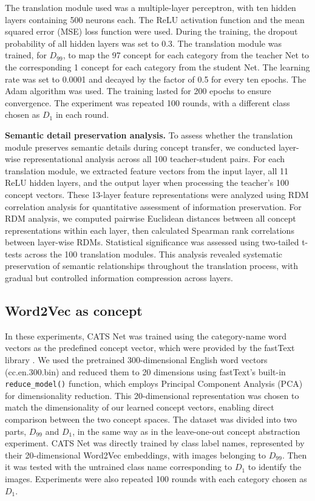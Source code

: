\documentclass[pdflatex,sn-mathphys-num,lineno]{sn-jnl}%
\begin{document}
\begin{CJK}{UTF8}{gbsn}
The translation module used was a multiple-layer perceptron, with ten hidden layers containing 500 neurons each. The ReLU activation function and the mean squared error (MSE) loss function were used. During the training, the dropout probability of all hidden layers was set to 0.3. The translation module was trained, for $D_{99}$, to map the 97 concept for each category from the teacher Net to the corresponding 1 concept for each category from the student Net. The learning rate was set to 0.0001 and decayed by the factor of 0.5 for every ten epochs. The Adam \cite{kingma_adam_2015} algorithm was used. The training lasted for 200 epochs to ensure convergence. The experiment was repeated 100 rounds, with a different class chosen as $D_1$ in each round.

\textbf{Semantic detail preservation analysis.} To assess whether the translation module preserves semantic details during concept transfer, we conducted layer-wise representational analysis across all 100 teacher-student pairs. For each translation module, we extracted feature vectors from the input layer, all 11 ReLU hidden layers, and the output layer when processing the teacher's 100 concept vectors. These 13-layer feature representations were analyzed using RDM correlation analysis for quantitative assessment of information preservation. For RDM analysis, we computed pairwise Euclidean distances between all concept representations within each layer, then calculated Spearman rank correlations between layer-wise RDMs. Statistical significance was assessed using two-tailed t-tests across the 100 translation modules. This analysis revealed systematic preservation of semantic relationships throughout the translation process, with gradual but controlled information compression across layers.

\subsection{Word2Vec as concept}
In these experiments, CATS Net was trained using the category-name word vectors as the predefined concept vector, which were provided by the fastText library \cite{mikolov_advances_2018}. We used the pretrained 300-dimensional English word vectors (cc.en.300.bin) and reduced them to 20 dimensions using fastText's built-in \texttt{reduce\_model()} function, which employs Principal Component Analysis (PCA) for dimensionality reduction. This 20-dimensional representation was chosen to match the dimensionality of our learned concept vectors, enabling direct comparison between the two concept spaces. The dataset was divided into two parts, $D_{99}$ and $D_1$, in the same way as in the leave-one-out concept abstraction experiment. CATS Net was directly trained by class label names, represented by their 20-dimensional Word2Vec embeddings, with images belonging to $D_{99}$. Then it was tested with the untrained class name corresponding to $D_1$ to identify the images. Experiments were also repeated 100 rounds with each category chosen as $D_1$.


\end{CJK}
\end{document}
